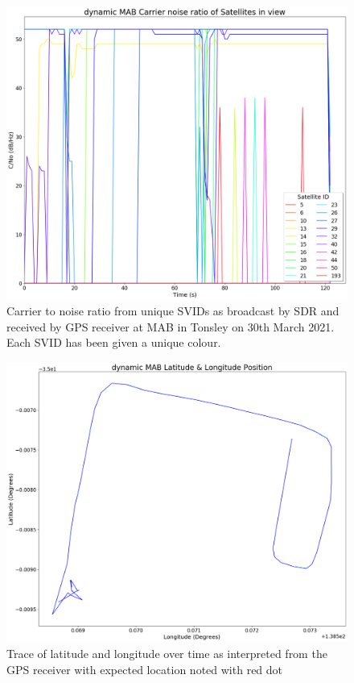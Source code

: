 \begin{figure}[h]
    \begin{centering}
        \includegraphics[width=14cm,keepaspectratio]{Figures/2021_3_30_dynamic_MAB Carrier noise ratio.png}
        \caption{Carrier to noise ratio from unique SVIDs as broadcast by SDR and received by GPS receiver at MAB in Tonsley on 30th March 2021. Each SVID has been given a unique colour.}
        \label{fig:MABdynamicCNo}
    \end{centering}
\end{figure}

\begin{figure}[h]
    \begin{centering}
        \includegraphics[width=14cm,keepaspectratio]{Figures/2021_3_30_dynamic_MAB Lat long position.png}
        \caption{Trace of latitude and longitude over time as interpreted from the GPS receiver with expected location noted with red dot}
        \label{fig:MABdynamicCoord}
    \end{centering}
\end{figure}

